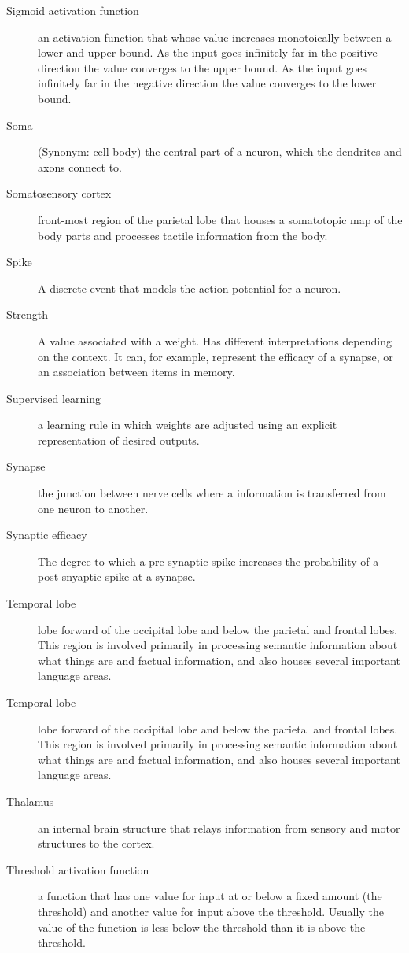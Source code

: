 \begin{description}
\item[Sigmoid activation function] an activation function that whose value increases  monotoically between a lower and upper bound. As the input goes infinitely far in the positive direction the value converges to the upper bound. As the input goes infinitely far in the negative direction the value converges to the lower bound.
\item[Soma] (Synonym: cell body) the central part of a neuron, which the dendrites and axons connect to.
\item[Somatosensory cortex] front-most region of the parietal lobe that houses a somatotopic map of the body parts and processes tactile information from the body.
\item[Spike] A discrete event that models the action potential for a neuron.
\item[Strength] A value associated with a weight. Has different interpretations depending on the context. It can, for example, represent the efficacy of a synapse, or an association between items in memory.
\item[Supervised learning] a learning rule in which weights are adjusted using an explicit representation of desired outputs.
\item[Synapse] the junction between nerve cells where a information is transferred from one neuron to another.
\item[Synaptic efficacy] The degree to which a pre-synaptic spike increases the probability of a post-snyaptic spike at a synapse.
\item[Temporal lobe] lobe forward of the occipital lobe and below the parietal and frontal lobes. This region is involved primarily in processing semantic information about what things are and factual information, and also houses several important language areas.
\item[Temporal lobe] lobe forward of the occipital lobe and below the parietal and frontal lobes. This region is involved primarily in processing semantic information about what things are and factual information, and also houses several important language areas.
\item[Thalamus] an internal brain structure that relays information from sensory and motor structures to the cortex.
\item[Threshold activation function] a function that has one value for  input at or below a fixed amount (the threshold) and another value for input above the threshold. Usually the value of the function is less below the  threshold than it is above the threshold.

\end{description}
